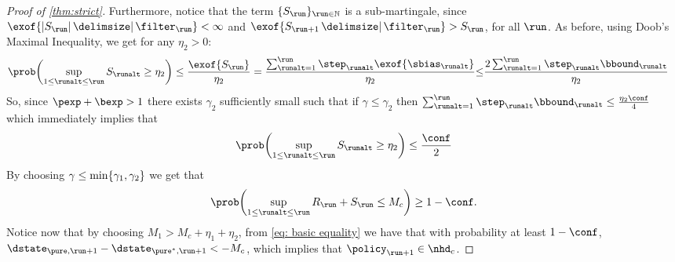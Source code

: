 \begin{proof}[Proof of \cref{thm:strict}]
Furthermore, notice that  the term $\{S_{\run}\}_{\run \in \N}$ is a sub-martingale, since $\exof{\abs{S_{\run}} \given \curr[\filter]} < \infty$ and $\exof{S_{\run+1} \given \curr[\filter]} > S_{\run}$, for all $\run$. As before, using Doob's Maximal Inequality, we get for any $\eta_2 > 0$:
 \begin{align}
     \prob\parens*{\sup_{1 \leq \runalt \leq \run}S_{\runalt} \geq \eta_{2}} \leq \frac{\exof{S_{\run}}}{\eta_{2}} 
     & = \frac{\sum_{\runalt = 1}^{\run} \step_{\runalt}\exof{\sbias_{\runalt}} }{\eta_2}
     {\leq}\frac{2\sum_{\runalt = 1}^{\run} \step_{\runalt}\bbound_{\runalt} }{\eta_2}
 \end{align}
So, since $\pexp+\bexp > 1$  there exists $\gamma_2$ sufficiently small such that if $\gamma \leq \gamma_2$ then
\(
\sum_{\runalt = 1}^{\run} \step_{\runalt}\bbound_{\runalt} \leq \frac{\eta_2\conf}{4}
\)
which immediately implies that 
\begin{equation}\label{eq:prob-bias}
    \prob\parens*{\sup_{1 \leq \runalt \leq \run}S_{\runalt} \geq \eta_{2}} \leq\dfrac{\conf}{2}
\end{equation}
By choosing $\gamma \leq \min\{\gamma_1,\gamma_2\}$ we get that 
 \begin{equation}
     \prob\parens*{\sup_{1 \leq \runalt \leq \run} R_\run + S_\run \leq M_c} \geq 1-\conf.
 \end{equation}
 Notice now that by choosing $M_1 > M_c + \eta_1 +\eta_2$, from \eqref{eq: basic equality} we have that with probability at least $1-\conf$, $\dstate_{\pure,\run+1} -\dstate_{\pure^*,\run+1} < -M_c$, which implies that $\policy_{\run+1}\in \nhd_c$.
 

\end{proof}
